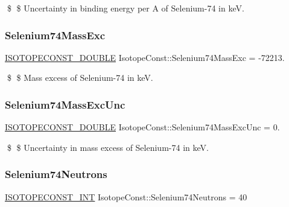 \$ \$ Uncertainty in binding energy per A of Selenium-\/74 in keV. \mbox{\label{group___isotope_const-_selenium-_se74_ga08554d04e09201d515038e075409879f}} 
\subsubsection{\texorpdfstring{Selenium74\+Mass\+Exc}{Selenium74MassExc}}
{\footnotesize\ttfamily \mbox{\hyperlink{group___isotope_const-_macros_ga8f45a7272ce02c0b4c65c44636ed719a}{I\+S\+O\+T\+O\+P\+E\+C\+O\+N\+S\+T\+\_\+\+D\+O\+U\+B\+LE}} Isotope\+Const\+::\+Selenium74\+Mass\+Exc = -\/72213.}

\$ \$ Mass excess of Selenium-\/74 in keV. \mbox{\label{group___isotope_const-_selenium-_se74_ga8e873b7834836466b89147b33aca864b}} 
\subsubsection{\texorpdfstring{Selenium74\+Mass\+Exc\+Unc}{Selenium74MassExcUnc}}
{\footnotesize\ttfamily \mbox{\hyperlink{group___isotope_const-_macros_ga8f45a7272ce02c0b4c65c44636ed719a}{I\+S\+O\+T\+O\+P\+E\+C\+O\+N\+S\+T\+\_\+\+D\+O\+U\+B\+LE}} Isotope\+Const\+::\+Selenium74\+Mass\+Exc\+Unc = 0.}

\$ \$ Uncertainty in mass excess of Selenium-\/74 in keV. \mbox{\label{group___isotope_const-_selenium-_se74_ga5374e48a03d5d51601dbaae687e748e8}} 
\subsubsection{\texorpdfstring{Selenium74\+Neutrons}{Selenium74Neutrons}}
{\footnotesize\ttfamily \mbox{\hyperlink{group___isotope_const-_macros_ga5f18360b3e99483a35c32d789e62621c}{I\+S\+O\+T\+O\+P\+E\+C\+O\+N\+S\+T\+\_\+\+I\+NT}} Isotope\+Const\+::\+Selenium74\+Neutrons = 40}

